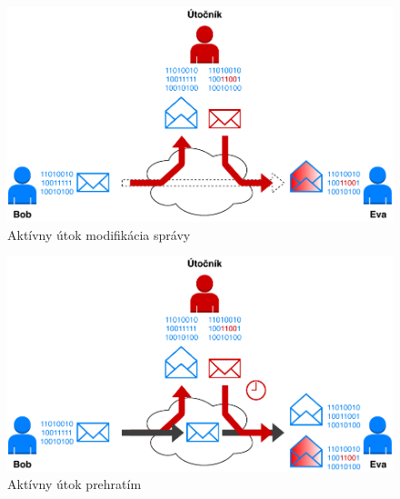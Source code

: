\begin{figure}[H]
	\begin{center}
		\includegraphics[scale=0.65]{obrazky/active-attack-mod.pdf}
	\end{center}
	\caption[Aktívny útok modifikácia správy]{Aktívny útok modifikácia správy}
	\label{active-attack-mod}	
\end{figure}

\begin{figure}[H]
	\begin{center}
		\includegraphics[scale=0.65]{obrazky/active-attack-reply.pdf}
	\end{center}
	\caption[Aktívny útok prehratím]{Aktívny útok prehratím}
	\label{active-attack-reply}
\end{figure}

